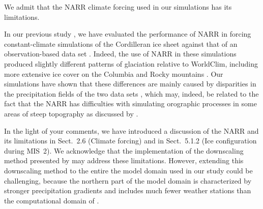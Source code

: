 We admit that the NARR climate forcing used in our simulations has its
limitations.

In our previous study \citep{Seguinot.etal.2014}, we have evaluated the
performance of NARR in forcing constant-climate simulations of the Cordilleran
ice sheet against that of an observation-based data set
\citep[WorldClim]{Hijmans.etal.2005}. Indeed, the use of NARR in these
simulations produced slightly different patterns of glaciation relative to
WorldClim, including more extensive ice cover on the Columbia and Rocky
mountains \citep[Figs.~6--7]{Seguinot.etal.2014}. Our simulations have shown
that these differences are mainly caused by disparities in the precipitation
fields of the two data sets \citep[Figs.13--14]{Seguinot.etal.2014}, which may,
indeed, be related to the fact that the NARR has difficulties with simulating
orographic processes in some areas of steep topography as discussed by
\citet{Jarosch.etal.2012}.

In the light of your comments, we have introduced a discussion of the NARR and
its limitations in Sect.~2.6 (Climate forcing) and in Sect.~5.1.2 (Ice
configuration during MIS~2). We acknowledge that the implementation of the
downscaling method presented by \citet{Jarosch.etal.2012} may address these
limitations. However, extending this downscaling method to the entire the model
domain used in our study could be challenging, because the northern part of the
model domain is characterized by stronger precipitation gradients and includes
much fewer weather stations than the computational domain of
\citet{Jarosch.etal.2012}.


